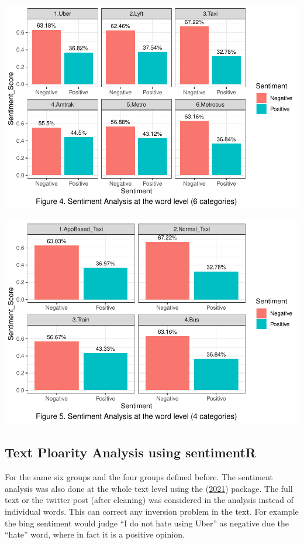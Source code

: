 \documentclass[
  12pt,
]{article}
\begin{document}
\includegraphics{Class_Project_Report_files/figure-latex/unnamed-chunk-15-1.pdf}

\includegraphics{Class_Project_Report_files/figure-latex/unnamed-chunk-16-1.pdf}

\hypertarget{text-ploarity-analysis-using-sentimentr}{%
\subsection{Text Ploarity Analysis using
sentimentR}\label{text-ploarity-analysis-using-sentimentr}}

For the same six groups and the four groups defined before. The
sentiment analysis was also done at the whole text level using the
(\protect\hyperlink{ref-sentimentr}{2021}) package. The full text or the
twitter post (after cleaning) was considered in the analysis instead of
individual words. This can correct any inversion problem in the text.
For example the bing sentiment would judge ``I do not hate using Uber''
as negative due the ``hate'' word, where in fact it is a positive
opinion.
\end{document}
